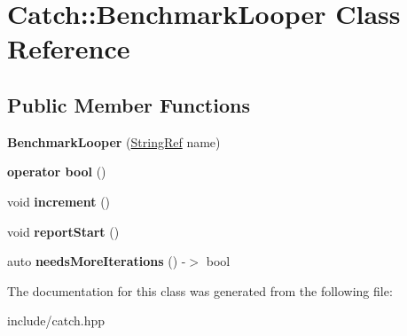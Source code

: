 \hypertarget{classCatch_1_1BenchmarkLooper}{}\section{Catch\+:\+:Benchmark\+Looper Class Reference}
\label{classCatch_1_1BenchmarkLooper}
\subsection*{Public Member Functions}
\begin{DoxyCompactItemize}
\item 
{\bfseries Benchmark\+Looper} (\hyperlink{classCatch_1_1StringRef}{String\+Ref} name)\hypertarget{classCatch_1_1BenchmarkLooper_ab9ba6397306a70082f39e63a8a71bde6}{}\label{classCatch_1_1BenchmarkLooper_ab9ba6397306a70082f39e63a8a71bde6}

\item 
{\bfseries operator bool} ()\hypertarget{classCatch_1_1BenchmarkLooper_a54da41bada9da038dc05faf41d746765}{}\label{classCatch_1_1BenchmarkLooper_a54da41bada9da038dc05faf41d746765}

\item 
void {\bfseries increment} ()\hypertarget{classCatch_1_1BenchmarkLooper_a210552aff5b19408637444d4bb35d59c}{}\label{classCatch_1_1BenchmarkLooper_a210552aff5b19408637444d4bb35d59c}

\item 
void {\bfseries report\+Start} ()\hypertarget{classCatch_1_1BenchmarkLooper_a0697d1b266112b110edf2025b82c4e77}{}\label{classCatch_1_1BenchmarkLooper_a0697d1b266112b110edf2025b82c4e77}

\item 
auto {\bfseries needs\+More\+Iterations} () -\/$>$ bool\hypertarget{classCatch_1_1BenchmarkLooper_a97bd944521f519b1593a5d1d2f9998fa}{}\label{classCatch_1_1BenchmarkLooper_a97bd944521f519b1593a5d1d2f9998fa}

\end{DoxyCompactItemize}


The documentation for this class was generated from the following file\+:\begin{DoxyCompactItemize}
\item 
include/catch.\+hpp\end{DoxyCompactItemize}
